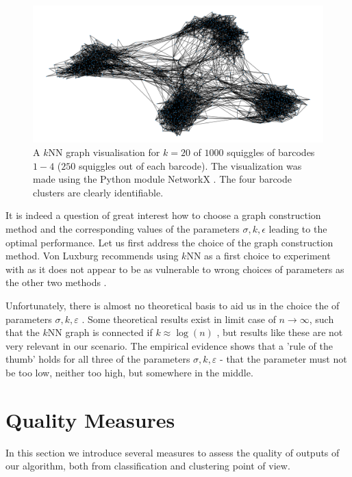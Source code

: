 \begin{figure}
    \centering
    \includegraphics[width=1.0\textwidth]{images/knn_graph_1000.png}
    \caption[$k$NN graph]{A $k$NN graph visualisation for $k=20$ of $1000$ squiggles of barcodes $1-4$ ($250$ squiggles out of each barcode). The visualization was made using the Python module NetworkX \cite{hagberg2005networkx}. The four barcode clusters are clearly identifiable.}
    \label{fig:knn_graph_1000}
\end{figure}

It is indeed a question of great interest how to choose a graph construction method and the corresponding values of the parameters $\sigma, k, \epsilon$ leading to the optimal performance. Let us first address the choice of the graph construction method. Von Luxburg recommends using $k$NN as a first choice to experiment with as it does not appear to be as vulnerable to wrong choices of parameters as the other two methods \cite{von2007tutorial}.

Unfortunately, there is almost no theoretical basis to aid us in the choice the of parameters $\sigma, k, \varepsilon$  \cite{von2007tutorial}. Some theoretical results exist in limit case of $n \to \infty$, such that the $k$NN graph is connected if $k \approx \log(n)$ \cite{von2007tutorial, brito1997connectivity}, but results like these are not very relevant in our scenario. The empirical evidence shows that a 'rule of the thumb' holds for all three of the parameters $\sigma, k, \varepsilon$ - that the parameter must not be too low, neither too high, but somewhere in the middle.

\section{Quality Measures}
In this section we introduce several measures to assess the quality of outputs of our algorithm, both from classification and clustering point of view.

